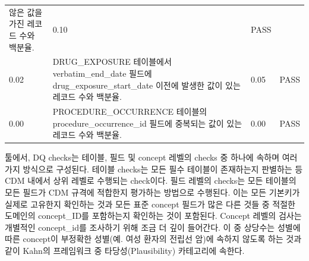 \documentclass[11pt]{book}
\theoremstyle{definition}
\theoremstyle{definition}
\theoremstyle{definition}
\theoremstyle{remark}
\begin{document}
\begin{longtable}[]{@{}llll@{}}
\begin{minipage}[t]{0.47\columnwidth}
않은 값을 가진 레코드 수와 백분율.\strut
\end{minipage} & \begin{minipage}[t]{0.10\columnwidth}\raggedright\strut
0.10\strut
\end{minipage} & \begin{minipage}[t]{0.07\columnwidth}\raggedright\strut
PASS\strut
\end{minipage}\tabularnewline
\begin{minipage}[t]{0.12\columnwidth}\raggedright\strut
0.02\strut
\end{minipage} & \begin{minipage}[t]{0.47\columnwidth}\raggedright\strut
DRUG\_EXPOSURE 테이블에서 verbatim\_end\_date 필드에
drug\_exposure\_start\_date 이전에 발생한 값이 있는 레코드 수와
백분율.\strut
\end{minipage} & \begin{minipage}[t]{0.10\columnwidth}\raggedright\strut
0.05\strut
\end{minipage} & \begin{minipage}[t]{0.07\columnwidth}\raggedright\strut
PASS\strut
\end{minipage}\tabularnewline
\begin{minipage}[t]{0.12\columnwidth}\raggedright\strut
0.00\strut
\end{minipage} & \begin{minipage}[t]{0.47\columnwidth}\raggedright\strut
PROCEDURE\_OCCURRENCE 테이블의 procedure\_occurrence\_id 필드에 중복되는
값이 있는 레코드 수와 백분율.\strut
\end{minipage} & \begin{minipage}[t]{0.10\columnwidth}\raggedright\strut
0.00\strut
\end{minipage} & \begin{minipage}[t]{0.07\columnwidth}\raggedright\strut
PASS\strut
\end{minipage}\tabularnewline
\bottomrule
\end{longtable}

툴에서, DQ checks는 테이블, 필드 및 concept 레벨의 checks 중 하나에
속하며 여러 가지 방식으로 구성된다. 테이블 checks는 모든 필수 테이블이
존재하는지 판별하는 등 CDM 내에서 상위 레벨로 수행되는 check이다. 필드
레벨의 checks는 모든 테이블의 모든 필드가 CDM 규격에 적합한지 평가하는
방법으로 수행된다. 이는 모든 기본키가 실제로 고유한지 확인하는 것과 모든
표준 concept 필드가 많은 다른 것들 중 적절한 도메인의 concept\_ID를
포함하는지 확인하는 것이 포함된다. Concept 레벨의 검사는 개별적인
concept\_id를 조사하기 위해 조금 더 깊이 들어간다. 이 중 상당수는 성별에
따른 concept이 부정확한 성별(예. 여성 환자의 전립선 암)에 속하지 않도록
하는 것과 같이 Kahn의 프레임워크 중 타당성(Plausibility) 카테고리에
속한다.
\end{document}
